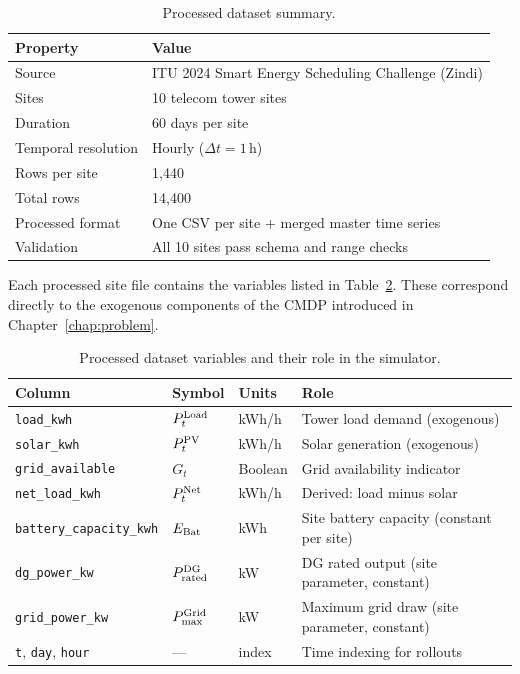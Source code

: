 \begin{table}[htb]
\centering
\small
\caption{Processed dataset summary.}
\label{tab:dataset_overview}
\begin{tabular}{ll}
\toprule
\textbf{Property} & \textbf{Value} \\
\midrule
Source              & ITU 2024 Smart Energy Scheduling Challenge (Zindi) \\
Sites               & 10 telecom tower sites \\
Duration            & 60 days per site \\
Temporal resolution & Hourly ($\Delta t = 1$\,h) \\
Rows per site       & 1{,}440 \\
Total rows          & 14{,}400 \\
Processed format    & One CSV per site + merged master time series \\
Validation          & All 10 sites pass schema and range checks \\
\bottomrule
\end{tabular}
\end{table}

Each processed site file contains the variables listed in
Table~\ref{tab:variables}.  These correspond directly to the exogenous
components of the CMDP introduced in Chapter~\ref{chap:problem}.

\begin{table}[htb]
\centering
\small
\caption{Processed dataset variables and their role in the simulator.}
\label{tab:variables}
\begin{tabular}{lllp{5.2cm}}
\toprule
\textbf{Column} & \textbf{Symbol} & \textbf{Units} & \textbf{Role} \\
\midrule
\texttt{load\_kwh}              & $P_t^{\mathrm{Load}}$ & kWh/h   & Tower load demand (exogenous) \\
\texttt{solar\_kwh}             & $P_t^{\mathrm{PV}}$   & kWh/h   & Solar generation (exogenous) \\
\texttt{grid\_available}        & $G_t$         & Boolean & Grid availability indicator \\
\texttt{net\_load\_kwh}         & $P_t^{\mathrm{Net}}$  & kWh/h   & Derived: load minus solar \\
\texttt{battery\_capacity\_kwh} & $E_{\mathrm{Bat}}$ & kWh & Site battery capacity (constant per site) \\
\texttt{dg\_power\_kw}          & $P^{\mathrm{DG}}_{\mathrm{rated}}$ & kW & DG rated output (site parameter, constant) \\
\texttt{grid\_power\_kw}        & $P^{\mathrm{Grid}}_{\max}$ & kW & Maximum grid draw (site parameter, constant) \\
\texttt{t}, \texttt{day}, \texttt{hour} & ---   & index   & Time indexing for rollouts \\
\bottomrule
\end{tabular}
\end{table}

